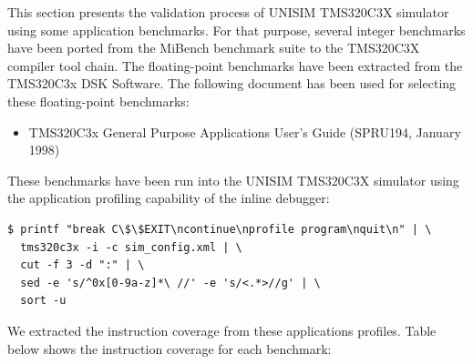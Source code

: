 This section presents the validation process of UNISIM TMS320C3X simulator using some application benchmarks.
For that purpose, several integer benchmarks have been ported from the MiBench benchmark suite to the TMS320C3X compiler tool chain.
The floating-point benchmarks have been extracted from the TMS320C3x DSK Software.
The following document has been used for selecting these floating-point benchmarks:
\begin{itemize}
\item TMS320C3x General Purpose Applications User's Guide (SPRU194, January 1998)
\end{itemize}

These benchmarks have been run into the UNISIM TMS320C3X simulator using the application profiling capability of the inline debugger:
\begin{verbatim}
$ printf "break C\$\$EXIT\ncontinue\nprofile program\nquit\n" | \
  tms320c3x -i -c sim_config.xml | \
  cut -f 3 -d ":" | \
  sed -e 's/^0x[0-9a-z]*\ //' -e 's/<.*>//g' | \
  sort -u
\end{verbatim}

We extracted the instruction coverage from these applications profiles.
Table below shows the instruction coverage for each benchmark:

